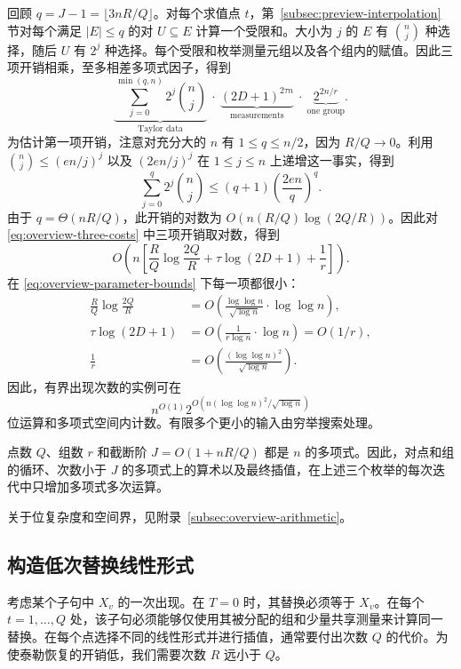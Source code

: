 \documentclass[11pt,reqno]{amsart}
\numberwithin{equation}{section}
\theoremstyle{definition}\newtheorem{definition}[theorem]{定义}
\theoremstyle{remark}\newtheorem{remark}[theorem]{注}
\renewcommand{\le}{\leqslant}
\begin{document}
回顾 $q=J-1=\lfloor3nR/Q\rfloor$。对每个求值点 $t$，第~\ref{subsec:preview-interpolation} 节对每个满足 $|E|\le q$ 的对 $U\subseteq E$ 计算一个受限和。大小为 $j$ 的 $E$ 有 $\binom nj$ 种选择，随后 $U$ 有 $2^j$ 种选择。每个受限和枚举测量元组以及各个组内的赋值。因此三项开销相乘，至多相差多项式因子，得到
\begin{equation}\label{eq:overview-three-costs}
 \underbrace{\sum_{j=0}^{\min(q,n)}2^j\binom nj}_{\text{Taylor data}}
 \ \cdot\
 \underbrace{(2D+1)^{2\tau n}}_{\text{measurements}}
 \ \cdot\
 \underbrace{2^{2n/r}}_{\text{one group}}.
\end{equation}
为估计第一项开销，注意对充分大的 $n$ 有 $1\le q\le n/2$，因为 $R/Q\to0$。利用 $\binom nj\le(en/j)^j$ 以及 $(2en/j)^j$ 在 $1\le j\le n$ 上递增这一事实，得到
\[
 \sum_{j=0}^q2^j\binom nj
 \le(q+1)\left(\frac{2en}{q}\right)^q.
\]
由于 $q=\Theta(nR/Q)$，此开销的对数为 $O(n(R/Q)\log(2Q/R))$。因此对 \eqref{eq:overview-three-costs} 中三项开销取对数，得到
\[
 O\!\left(n\left[
       \frac RQ\log\frac{2Q}{R}
       +\tau\log(2D+1)+\frac1r\right]\right).
\]
在 \eqref{eq:overview-parameter-bounds} 下每一项都很小：
\[
 \begin{aligned}
 \frac RQ\log\frac{2Q}{R}
   &=O\!\left(\frac{\log\log n}{\sqrt{\log n}}
                      \cdot\log\log n\right),\\
 \tau\log(2D+1)&=O\!\left(\frac1{r\log n}\cdot\log n\right)
                  =O(1/r),\\
 \frac1r&=O\!\left(\frac{(\log\log n)^2}{\sqrt{\log n}}\right).
 \end{aligned}
\]
因此，有界出现次数的实例可在
\begin{equation}\label{eq:overview-bounded-time}
 n^{O(1)}2^{O(n(\log\log n)^2/\sqrt{\log n})}
\end{equation}
位运算和多项式空间内计数。有限多个更小的输入由穷举搜索处理。

点数 $Q$、组数 $r$ 和截断阶 $J=O(1+nR/Q)$ 都是 $n$ 的多项式。因此，对点和组的循环、次数小于 $J$ 的多项式上的算术以及最终插值，在上述三个枚举的每次迭代中只增加多项式多次运算。

关于位复杂度和空间界，见附录~\ref{subsec:overview-arithmetic}。

\subsection{构造低次替换线性形式}
\label{subsec:preview-auxiliary}
考虑某个子句中 $X_v$ 的一次出现。在 $T=0$ 时，其替换必须等于 $X_v$。在每个 $t=1,\ldots,Q$ 处，该子句必须能够仅使用其被分配的组和少量共享测量来计算同一替换。在每个点选择不同的线性形式并进行插值，通常要付出次数 $Q$ 的代价。为使泰勒恢复的开销低，我们需要次数 $R$ 远小于 $Q$。
\end{document}
